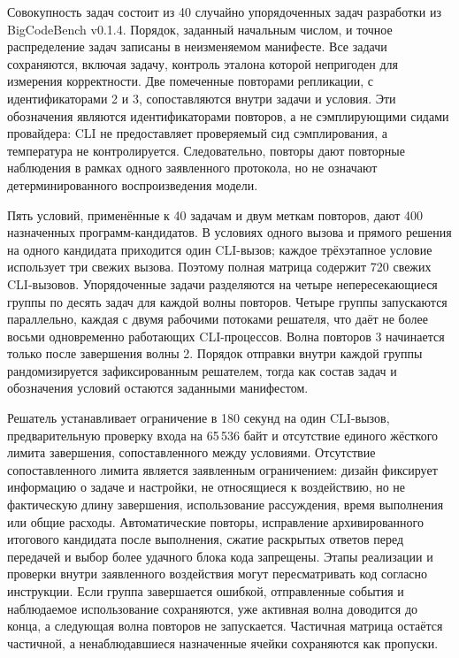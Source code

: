 Совокупность задач состоит из 40 случайно упорядоченных задач разработки из BigCodeBench v0.1.4. Порядок, заданный начальным числом, и точное распределение задач записаны в неизменяемом манифесте. Все задачи сохраняются, включая задачу, контроль эталона которой непригоден для измерения корректности. Две помеченные повторами репликации, с идентификаторами 2 и 3, сопоставляются внутри задачи и условия. Эти обозначения являются идентификаторами повторов, а не сэмплирующими сидами провайдера: CLI не предоставляет проверяемый сид сэмплирования, а температура не контролируется. Следовательно, повторы дают повторные наблюдения в рамках одного заявленного протокола, но не означают детерминированного воспроизведения модели.

Пять условий, применённые к 40 задачам и двум меткам повторов, дают 400 назначенных программ-кандидатов. В условиях одного вызова и прямого решения на одного кандидата приходится один CLI-вызов; каждое трёхэтапное условие использует три свежих вызова. Поэтому полная матрица содержит 720 свежих CLI-вызовов. Упорядоченные задачи разделяются на четыре непересекающиеся группы по десять задач для каждой волны повторов. Четыре группы запускаются параллельно, каждая с двумя рабочими потоками решателя, что даёт не более восьми одновременно работающих CLI-процессов. Волна повторов 3 начинается только после завершения волны 2. Порядок отправки внутри каждой группы рандомизируется зафиксированным решателем, тогда как состав задач и обозначения условий остаются заданными манифестом.

Решатель устанавливает ограничение в 180 секунд на один CLI-вызов, предварительную проверку входа на 65\,536 байт и отсутствие единого жёсткого лимита завершения, сопоставленного между условиями. Отсутствие сопоставленного лимита является заявленным ограничением: дизайн фиксирует информацию о задаче и настройки, не относящиеся к воздействию, но не фактическую длину завершения, использование рассуждения, время выполнения или общие расходы. Автоматические повторы, исправление архивированного итогового кандидата после выполнения, сжатие раскрытых ответов перед передачей и выбор более удачного блока кода запрещены. Этапы реализации и проверки внутри заявленного воздействия могут пересматривать код согласно инструкции. Если группа завершается ошибкой, отправленные события и наблюдаемое использование сохраняются, уже активная волна доводится до конца, а следующая волна повторов не запускается. Частичная матрица остаётся частичной, а ненаблюдавшиеся назначенные ячейки сохраняются как пропуски.

